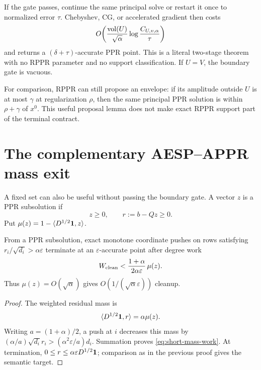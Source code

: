 If the gate passes, continue the same principal solve or restart it once to
normalized error $\tau$.  Chebyshev, CG, or accelerated gradient then costs
\begin{equation}
 O\!\left(\frac{\operatorname{vol}(U)}{\sqrt\alpha}
          \log\frac{C_{U,v,\alpha}}{\tau}\right)
 \label{eq:short-fixed-work}
\end{equation}
and returns a $(\delta+\tau)$-accurate PPR point.  This is a literal
two-stage theorem with no RPPR parameter and no support classification.  If
$U=V$, the boundary gate is vacuous.

For comparison, RPPR can still propose an envelope: if its amplitude outside
$U$ is at most $\gamma$ at regularization $\rho$, then the same principal PPR
solution is within $\rho+\gamma$ of $x^0$.  This useful proposal lemma does
not make exact RPPR support part of the terminal contract.

\section{The complementary AESP--APPR mass exit}

A fixed set can also be useful without passing the boundary gate.  A vector
$z$ is a PPR subsolution if
\begin{equation}
 z\geq0,\qquad r:=b-Qz\geq0.
\end{equation}
Put $\mu(z)=1-\langle D^{1/2}\mathbf{1},z\rangle$.

\begin{theorem}
\label{thm:short-mass-cleanup}
From a PPR subsolution, exact monotone coordinate pushes on rows satisfying
$r_i/\sqrt{d_i}>\alpha\varepsilon$ terminate at an
$\varepsilon$-accurate point after degree work
\begin{equation}
 W_{\rm clean}<
 \frac{1+\alpha}{2\alpha\varepsilon}\,\mu(z).
 \label{eq:short-mass-work}
\end{equation}
Thus $\mu(z)=O(\sqrt\alpha)$ gives
$O(1/(\sqrt\alpha\varepsilon))$ cleanup.
\end{theorem}

\begin{proof}
The weighted residual mass is
\begin{equation*}
 \langle D^{1/2}\mathbf{1},r\rangle=\alpha\mu(z).
\end{equation*}
Writing $a=(1+\alpha)/2$, a push at $i$ decreases this mass by
$(\alpha/a)\sqrt{d_i}r_i>(\alpha^2\varepsilon/a)d_i$.  Summation proves
\cref{eq:short-mass-work}.  At termination,
$0\leq r\leq\alpha\varepsilon D^{1/2}\mathbf{1}$; comparison as in the previous
proof gives the semantic target.
\end{proof}

